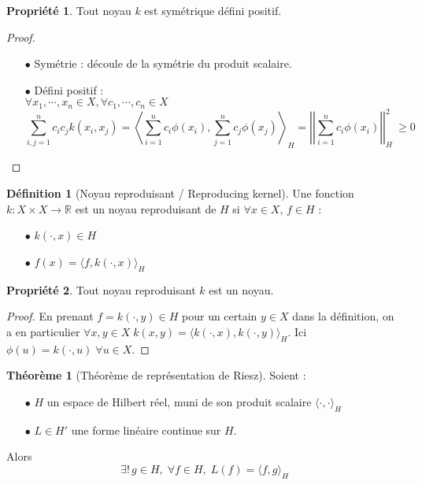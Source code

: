 \documentclass[a4paper, 11pt, french]{article}
\theoremstyle{definition}
\newtheorem{definition}{Définition}
\newtheorem{theorem}{Théorème}
\newtheorem{property}{Propriété}
\begin{document}
	\begin{property}
		Tout noyau $k$ est symétrique défini positif.
	\end{property}
	\begin{proof}
		\begin{itemize}
			\item[$\bullet$] Symétrie : découle de la symétrie du produit scalaire.			
			\item[$\bullet$] Défini positif : \\
			$\forall x_1, \cdots, x_n \in X, \forall c_1, \cdots, c_n \in X$
			\[\sum_{i,j=1}^{n} c_i c_j k(x_i, x_j) = \left\langle \sum_{i=1}^{n} c_i \phi(x_i), \sum_{j=1}^{n} c_j \phi(x_j) \right\rangle_H = \left|\left|\sum_{i=1}^{n} c_i \phi(x_i)\right|\right|_H^2\ \geq 0\]
		\end{itemize}
	\end{proof}

	\begin{definition}[Noyau reproduisant / Reproducing kernel]
		Une fonction $k : X \times X \to \mathbb{R}$ est un noyau reproduisant de $H$ si $\forall x \in X, \, f \in H$ :
		\begin{itemize}
			\item[$\bullet$] $k(\cdot, x) \in H$			
			\item[$\bullet$] $f(x) = \langle f, k(\cdot, x) \rangle_H$
		\end{itemize}
	\end{definition}

	\newpage

	\begin{property}
	\label{prop:reprotokernel}
		Tout noyau reproduisant $k$ est un noyau.
	\end{property}
	\begin{proof}
		En prenant $f = k(\cdot, y) \in H$ pour un certain $y \in X$ dans la définition, on a en particulier $\forall x, y \in X \; k(x,y) = \langle k(\cdot, x), k(\cdot, y) \rangle_H$. Ici $\phi(u) = k(\cdot, u) \; \forall u \in X$.
	\end{proof}

	\begin{theorem}[Théorème de représentation de Riesz]
		Soient :
		\begin{itemize}
			\item[$\bullet$] $H$ un espace de Hilbert réel, muni de son produit scalaire $\langle \cdot, \cdot \rangle_H$
			\item[$\bullet$] $L \in H'$ une forme linéaire continue sur $H$.
		\end{itemize}
		Alors \[\exists ! \, g \in H, \; \forall f \in H, \; L(f) = \langle f, g \rangle_H\]
	\end{theorem}
\end{document}
